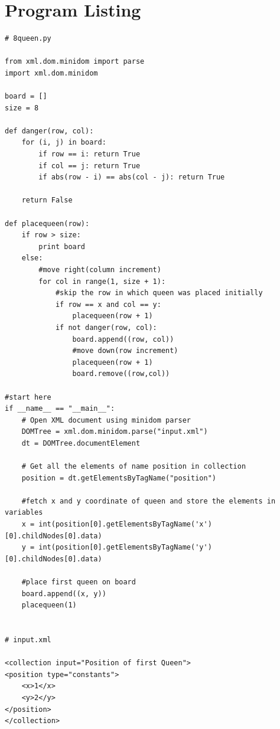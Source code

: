 \documentclass[10pt,a4paper]{article}
\begin{document}
\section{Program Listing}
\begin{lstlisting}
# 8queen.py

from xml.dom.minidom import parse
import xml.dom.minidom

board = []
size = 8

def danger(row, col):
    for (i, j) in board:
        if row == i: return True
        if col == j: return True
        if abs(row - i) == abs(col - j): return True

    return False
    
def placequeen(row):
    if row > size:
        print board
    else:
        #move right(column increment)
        for col in range(1, size + 1):
            #skip the row in which queen was placed initially
            if row == x and col == y:
                placequeen(row + 1)
            if not danger(row, col):
                board.append((row, col))
                #move down(row increment)
                placequeen(row + 1)
                board.remove((row,col))

#start here
if __name__ == "__main__":
    # Open XML document using minidom parser
    DOMTree = xml.dom.minidom.parse("input.xml")
    dt = DOMTree.documentElement

	# Get all the elements of name position in collection
    position = dt.getElementsByTagName("position")

	#fetch x and y coordinate of queen and store the elements in variables
    x = int(position[0].getElementsByTagName('x')[0].childNodes[0].data)
    y = int(position[0].getElementsByTagName('y')[0].childNodes[0].data) 

    #place first queen on board
    board.append((x, y))
    placequeen(1)
    
    
# input.xml

<collection input="Position of first Queen">
<position type="constants">
	<x>1</x>
	<y>2</y>
</position>
</collection>

\end{lstlisting}
\end{document}
